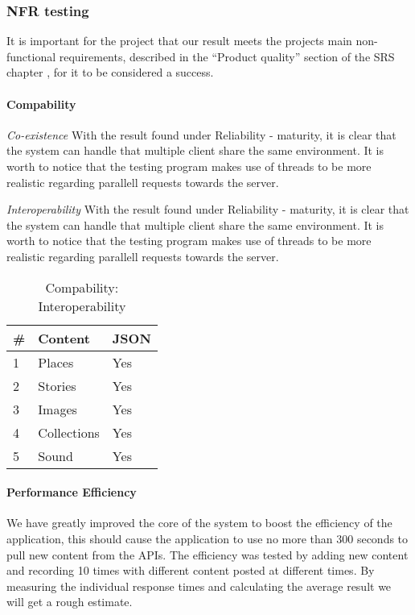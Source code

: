 \subsubsection{NFR testing}
It is important for the project that our result meets the projects main non-functional requirements, described in the ``Product quality'' section of the SRS chapter , for it to be considered a success. 

\paragraph{Compability}

\emph{Co-existence}
With the result found under Reliability - maturity, it is clear that the system can handle  that multiple client share the same environment. It is worth to notice that the testing program makes use of threads to be more realistic regarding parallell requests towards the server.

\emph{Interoperability}
With the result found under Reliability - maturity, it is clear that the system can handle  that multiple client share the same environment. It is worth to notice that the testing program makes use of threads to be more realistic regarding parallell requests towards the server.

\begin{table}[!htp]
\begin{center}
	\begin{tabular}{ | l | l | l | }
	\hline
	 \#	 	& Content 		& JSON 	\\ \hline
	 1		&Places		& Yes	\\ \hline
	 2		&Stories		& Yes	\\ \hline
	 3		&Images		& Yes	\\ \hline
	 4		&Collections	& Yes	\\ \hline
	 5		&Sound		& Yes 	\\
	 \hline
 	 \end{tabular}
\end{center}
\caption{Compability: Interoperability}
\label{tab:Compability: Interoperabilityt}
\end{table}

\paragraph{Performance Efficiency}
We have greatly improved the core of the system to boost the efficiency of the application, this should cause the application to use no more than 300 seconds to pull new content from the APIs. The efficiency was tested by adding new content and recording 10 times with different content posted at different times. By measuring the individual response times and calculating the average result we will get a rough estimate.\\

